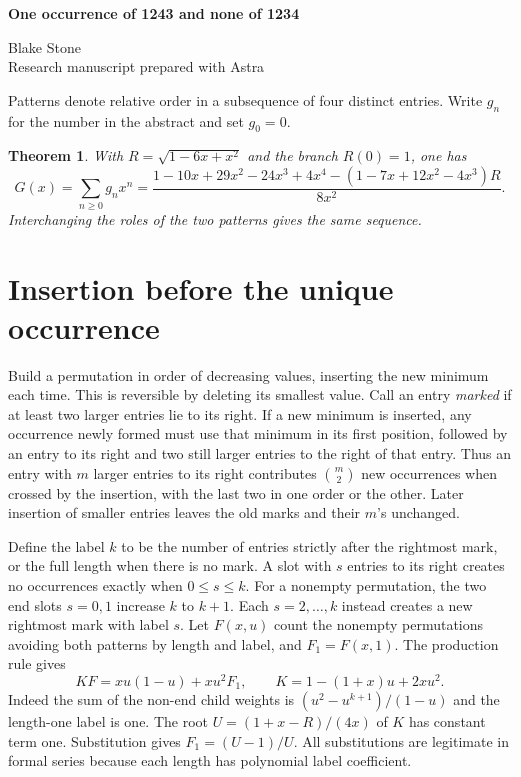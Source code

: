 \documentclass[11pt,letterpaper]{article}
\newtheorem{theorem}{Theorem}
\begin{document}
\thispagestyle{plain}
\begin{center}
{\LARGE\bfseries One occurrence of 1243 and none of 1234\par}
\vspace{0.5em}
Blake Stone\\
{\small Research manuscript prepared with Astra}
\end{center}

\begin{abstract}
We derive the generating function for permutations avoiding \(1234\) and containing \(1243\) exactly once. Tracking the insertion of a new minimum proves the four formulas proposed by Pereira and Kote\v{s}ovec in OEIS A224292. With two occurrences we give the generating functions for every split between the two patterns, including OEIS A224293.
\end{abstract}

Patterns denote relative order in a subsequence of four distinct entries. Write \(g_n\) for the number in the abstract and set \(g_0=0\).
\begin{theorem}
With \(R=\sqrt{1-6x+x^2}\) and the branch \(R(0)=1\), one has
\[
 G(x)=\sum_{n\ge0}g_nx^n
 =\frac{1-10x+29x^2-24x^3+4x^4-(1-7x+12x^2-4x^3)R}{8x^2}.
\]
Interchanging the roles of the two patterns gives the same sequence.
\end{theorem}

\section{Insertion before the unique occurrence}
Build a permutation in order of decreasing values, inserting the new minimum each time. This is reversible by deleting its smallest value. Call an entry \emph{marked} if at least two larger entries lie to its right. If a new minimum is inserted, any occurrence newly formed must use that minimum in its first position, followed by an entry to its right and two still larger entries to the right of that entry. Thus an entry with \(m\) larger entries to its right contributes \(\binom m2\) new occurrences when crossed by the insertion, with the last two in one order or the other. Later insertion of smaller entries leaves the old marks and their \(m\)'s unchanged.

Define the label \(k\) to be the number of entries strictly after the rightmost mark, or the full length when there is no mark. A slot with \(s\) entries to its right creates no occurrences exactly when \(0\le s\le k\). For a nonempty permutation, the two end slots \(s=0,1\) increase \(k\) to \(k+1\). Each \(s=2,\ldots,k\) instead creates a new rightmost mark with label \(s\). Let \(F(x,u)\) count the nonempty permutations avoiding both patterns by length and label, and \(F_1=F(x,1)\). The production rule gives
\[
 K F=xu(1-u)+xu^2F_1,\qquad K=1-(1+x)u+2xu^2.
\]
Indeed the sum of the non-end child weights is \((u^2-u^{k+1})/(1-u)\) and the length-one label is one. The root \(U=(1+x-R)/(4x)\) of \(K\) has constant term one. Substitution gives \(F_1=(U-1)/U\). All substitutions are legitimate in formal series because each length has polynomial label coefficient.
\end{document}
